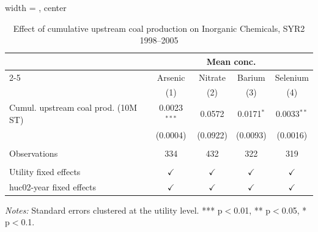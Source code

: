 
\begin{table}[htbp]
   
   \caption{\label{tab:6yr_huc02fe_inorg_ravalli_2005} Effect of cumulative upstream coal production on Inorganic Chemicals, SYR2 1998--2005}
   \bigskip
   
   \centering
   
   \begin{adjustbox}{width = \textwidth, center}
      
      
      \begin{tabular}{lcccc}
         \toprule
         
          & \multicolumn{4}{c}{Mean conc.}\\
         \cmidrule(lr){2-5}
         
                                             & Arsenic        & Nitrate       & Barium        & Selenium \\   
         
                                             & (1)            & (2)           & (3)           & (4)\\  
         
         \midrule 
         Cumul. upstream coal prod. (10M ST) & 0.0023$^{***}$ & 0.0572        & 0.0171$^{*}$  & 0.0033$^{**}$\\   
                                             & (0.0004)       & (0.0922)      & (0.0093)      & (0.0016)\\   
         
          \\
         
         Observations                        & 334            & 432           & 322           & 319\\  
         
          \\
         
         Utility fixed effects               & $\checkmark$   & $\checkmark$  & $\checkmark$  & $\checkmark$\\   
         huc02-year fixed effects            & $\checkmark$   & $\checkmark$  & $\checkmark$  & $\checkmark$\\   
         
         \bottomrule
         
      \end{tabular}
      
      
      
   \end{adjustbox}
      {\tiny\linespread{1}\selectfont \par \raggedright 
   \textit{Notes:} Standard errors clustered at the utility level. *** p$<$0.01, ** p$<$0.05, * p$<$0.1.}
   
\end{table}


